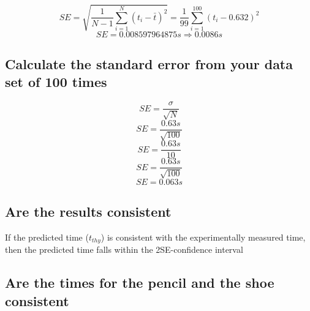 \documentclass[11pt, letterpaper, includehead]{article}
\begin{document}
$$SE = \sqrt{\frac{1}{N - 1}\sum_{i = 1}^{N}(t_i-\bar{t})^2} = \frac{1}{99}\sum_{i = 1}^{100}(t_i - 0.632)^2$$
$$SE = 0.008597964875s \Rightarrow \boxed{0.0086s}$$

\subsection{Calculate the standard error from your data set of 100 times}

$$SE = \frac{\sigma}{\sqrt{N}}$$
$$SE = \frac{0.63s}{\sqrt{100}}$$
$$SE = \frac{0.63s}{10}$$
$$SE = \frac{0.63s}{\sqrt{100}}$$
$$SE = \boxed{0.063s}$$

\subsection{Are the results consistent}
If the predicted time ($t_{thy}$) is consistent with the experimentally 
measured time, then the predicted time falls within the 2SE-confidence interval

\subsection{Are the times for the pencil and the shoe consistent}
\end{document}
